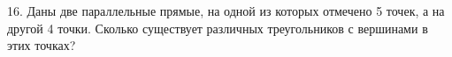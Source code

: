16. Даны две параллельные прямые, на одной из которых отмечено 5 точек, а на другой 4 точки. Сколько существует различных треугольников с вершинами в этих точках?\\
